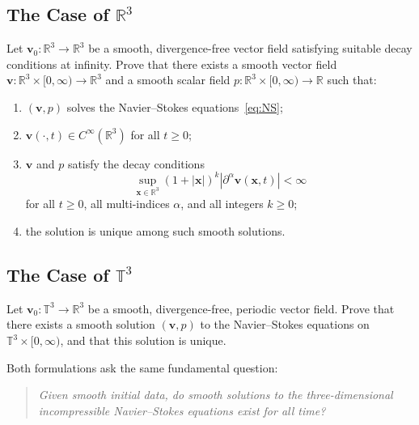 \subsection{The Case of $\mathbb{R}^3$}

\begin{problem}
\label{prob:NS-R3}
Let $\mathbf{v}_0: \mathbb{R}^3 \to \mathbb{R}^3$ be a smooth, divergence-free vector field satisfying suitable decay conditions at infinity. Prove that there exists a smooth vector field $\mathbf{v}: \mathbb{R}^3 \times [0, \infty) \to \mathbb{R}^3$ and a smooth scalar field $p: \mathbb{R}^3 \times [0, \infty) \to \mathbb{R}$ such that:
\begin{enumerate}
\item $(\mathbf{v}, p)$ solves the Navier--Stokes equations~\eqref{eq:NS};
\item $\mathbf{v}(\cdot, t) \in C^\infty(\mathbb{R}^3)$ for all $t \ge 0$;
\item $\mathbf{v}$ and $p$ satisfy the decay conditions
\[
\sup_{\mathbf{x} \in \mathbb{R}^3} (1 + |\mathbf{x}|)^k |\partial^\alpha \mathbf{v}(\mathbf{x}, t)| < \infty
\]
for all $t \ge 0$, all multi-indices $\alpha$, and all integers $k \ge 0$;
\item the solution is unique among such smooth solutions.
\end{enumerate}
\end{problem}

\subsection{The Case of $\mathbb{T}^3$}

\begin{problem}
\label{prob:NS-T3}
Let $\mathbf{v}_0: \mathbb{T}^3 \to \mathbb{R}^3$ be a smooth, divergence-free, periodic vector field. Prove that there exists a smooth solution $(\mathbf{v}, p)$ to the Navier--Stokes equations on $\mathbb{T}^3 \times [0, \infty)$, and that this solution is unique.
\end{problem}

Both formulations ask the same fundamental question:

\begin{quote}
\textit{Given smooth initial data, do smooth solutions to the three-dimensional incompressible Navier--Stokes equations exist for all time?}
\end{quote}

